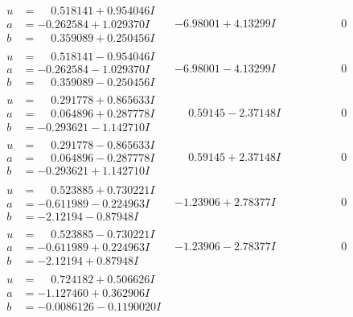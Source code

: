 \documentclass[1p]{elsarticle_modified}
\theoremstyle{definition}
\begin{document}
$$\begin{array}{c|c|c}
\begin{aligned}
u &= \phantom{-}0.518141 + 0.954046 I \\
a &= -0.262584 + 1.029370 I \\
b &= \phantom{-}0.359089 + 0.250456 I\end{aligned}
 & -6.98001 + 4.13299 I & \phantom{-0.000000 } 0 \\ \hline\begin{aligned}
u &= \phantom{-}0.518141 - 0.954046 I \\
a &= -0.262584 - 1.029370 I \\
b &= \phantom{-}0.359089 - 0.250456 I\end{aligned}
 & -6.98001 - 4.13299 I & \phantom{-0.000000 } 0 \\ \hline\begin{aligned}
u &= \phantom{-}0.291778 + 0.865633 I \\
a &= \phantom{-}0.064896 + 0.287778 I \\
b &= -0.293621 - 1.142710 I\end{aligned}
 & \phantom{-}0.59145 - 2.37148 I & \phantom{-0.000000 } 0 \\ \hline\begin{aligned}
u &= \phantom{-}0.291778 - 0.865633 I \\
a &= \phantom{-}0.064896 - 0.287778 I \\
b &= -0.293621 + 1.142710 I\end{aligned}
 & \phantom{-}0.59145 + 2.37148 I & \phantom{-0.000000 } 0 \\ \hline\begin{aligned}
u &= \phantom{-}0.523885 + 0.730221 I \\
a &= -0.611989 - 0.224963 I \\
b &= -2.12194 - 0.87948 I\end{aligned}
 & -1.23906 + 2.78377 I & \phantom{-0.000000 } 0 \\ \hline\begin{aligned}
u &= \phantom{-}0.523885 - 0.730221 I \\
a &= -0.611989 + 0.224963 I \\
b &= -2.12194 + 0.87948 I\end{aligned}
 & -1.23906 - 2.78377 I & \phantom{-0.000000 } 0 \\ \hline\begin{aligned}
u &= \phantom{-}0.724182 + 0.506626 I \\
a &= -1.127460 + 0.362906 I \\
b &= -0.0086126 - 0.1190020 I\end{aligned}

\end{array}$$
\end{document}
